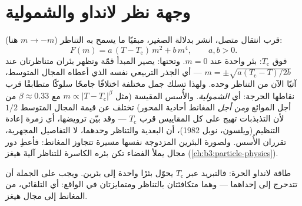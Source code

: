 \section{وجهة نظر لانداو والشمولية}

\begin{proposition}\label{prop:b3:phase-transitions:landau}
قرب انتقال متصل، انشر  بدلالة  الصغير، مبقيًا ما يسمح به التناظر ($m \to -m$
هنا):
\[
F(m) = a\,(T - T_{\text{c}})\,m^2 + b\,m^4 , \qquad a, b > 0 .
\]
فوق $T_{\text{c}}$: بئر واحدة عند $m = 0$. وتحتها: يصير المبدأ
قمّة وتظهر بئران متناظرتان عند $m = \pm
\sqrt{a(T_{\text{c}} - T)/2b}$ --- أي الجذر التربيعي نفسه الذي أعطاه المجال
المتوسط، آتيًا الآن من التناظر وحده. ولهذا تسلك جمل
مختلفة اختلافًا جامحًا سلوكًا متطابقًا قرب نقاطها الحرجة:
أي \emph{الشمولية}. والأُسس المقيسة (مثل $m \propto |T -
T_{\text{c}}|^\beta$ مع $\beta \approx 0.33$ من أجل الموائع
\emph{ومن أجل} المغانط أحادية المحور) تختلف عن قيمة المجال المتوسط $1/2$
لأن التذبذبات تهيج على كل المقاييس قرب $T_{\text{c}}$ ---
وقد بيّن ترويضها، أي زمرة إعادة التنظيم (ويلسون، نوبل 1982)،
أن البعدية والتناظر وحدهما، لا التفاصيل المجهرية،
تقرران الأُسس. ولصورة البئرين المزدوجة نفسها
مسيرة تتجاوز المغانط: فأعطِ  دور
مجال يملأ الفضاء تكن بئره الكاسرة للتناظر آليةَ
هيغز (\cref{ch:b3:particle-physics}).
\end{proposition}
\admitted

\begin{omfigure}

{\small طاقة لانداو الحرة: فالتبريد عبر $T_{\text{c}}$ يحوّل
بئرًا واحدة إلى بئرين. ويجب على الجملة أن تتدحرج إلى إحداهما ---
وهما متكافئتان بالتناظر ومتمايزتان في الواقع: أي  التلقائي، من المغانط إلى مجال هيغز.}
\end{omfigure}


